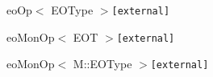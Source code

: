 \begin{CompactList}
\begin{CompactList}
\begin{CompactList}
\begin{CompactList}
\begin{CompactList}
\end{CompactList}
\end{CompactList}
\end{CompactList}
\end{CompactList}
\item eo\-Op$<$ EOType $>${\tt  [external]}\begin{CompactList}
\item eo\-Mon\-Op$<$ EOT $>${\tt  [external]}\item eo\-Mon\-Op$<$ M::EOType $>${\tt  [external]}\end{CompactList}
\end{CompactList}

